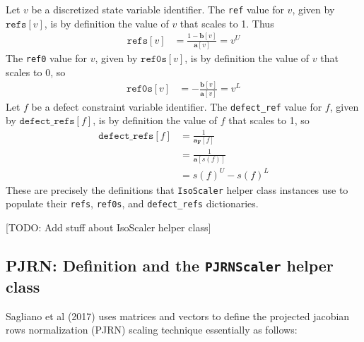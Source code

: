 \documentclass{article}
\theoremstyle{definition}
\begin{document}
\noindent
Let $v$ be a discretized state variable identifier. The \texttt{ref} value for $v$, given by $\texttt{refs}[v]$, is by definition the value of $v$ that scales to 1. Thus
\begin{align*}
    \texttt{refs}[v] &= \frac{1 - \textbf{b}[v]}{\textbf{a}[v]} = v^U
\end{align*}
The \texttt{ref0} value for $v$, given by $\texttt{ref0s}[v]$, is by definition the value of $v$ that scales to 0, so
\begin{align*}
    \texttt{ref0s}[v] &= -\frac{\textbf{b}[v]}{\textbf{a}[v]} = v^L
\end{align*}
Let $f$ be a defect constraint variable identifier. The \texttt{defect\_ref} value for $f$, given by $\texttt{defect\_refs}[f]$, is by definition the value of $f$ that scales to 1, so
\begin{align*}
    \texttt{defect\_refs}[f] &= \frac{1}{\textbf{a}_\textbf{F}[f]} \\
    &= \frac{1}{\textbf{a}[s(f)]} \\
    &= s(f)^U - s(f)^L
\end{align*}
These are precisely the definitions that \texttt{IsoScaler} helper class instances use to populate their \texttt{refs}, \texttt{ref0s}, and \texttt{defect\_refs} dictionaries.

[TODO: Add stuff about IsoScaler helper class]

\subsection*{PJRN: Definition and the \texttt{PJRNScaler} helper class}

Sagliano et al (2017) uses matrices and vectors to define the projected jacobian rows normalization (PJRN) scaling technique essentially as follows: \\
\end{document}
